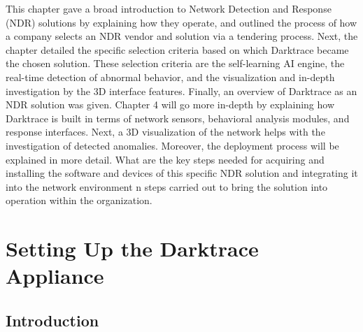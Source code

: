 \documentclass[12pt,a4paper]{report}
\begin{document}
 This chapter gave a broad introduction to Network Detection and Response
(NDR) solutions by explaining how they operate, and outlined the process of
how a company selects an NDR vendor and solution via a tendering process. Next, the
chapter detailed the specific selection criteria based on which Darktrace became the
chosen solution. These selection criteria are the self-learning AI engine, the real-time
detection of abnormal behavior, and the visualization and in-depth investigation by the
3D interface features. Finally, an overview of Darktrace as an NDR solution was given.
Chapter 4 will go more in-depth by explaining how Darktrace is built in terms
of network sensors, behavioral analysis modules, and response interfaces. Next, a 3D
visualization of the network helps with the investigation of detected anomalies.
Moreover, the deployment process will be explained in more detail. What are the key
steps needed for acquiring and installing the software and devices of this specific
NDR solution and integrating it into the network environment n steps carried out to bring the solution into
operation within the organization.









































\chapter{Setting Up the Darktrace Appliance}

\section{Introduction}
\end{document}
